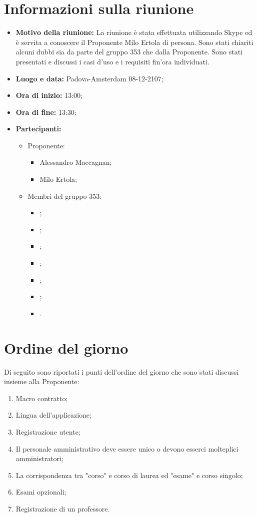 \documentclass[VER-2017-12-08.tex]{subfiles}
\begin{document}
\chapter{Informazioni sulla riunione}
\begin{itemize}
	\item \textbf{Motivo della riunione:} La riunione è stata effettuata utilizzando Skype ed è servita a conoscere il Proponente Milo Ertola di persona. Sono stati chiariti alcuni dubbi sia da parte del gruppo 353 che dalla Proponente. Sono stati presentati e discussi i casi d'uso e i requisiti fin'ora individuati.

	\item \textbf{Luogo e data:} Padova-Amsterdam 08-12-2107;
	\item \textbf{Ora di inizio:} 13:00;
	\item \textbf{Ora di fine:} 13:30;
	\item \textbf{Partecipanti:}
	\begin{itemize}
		\item Proponente:
		\begin{itemize}
			\item Alessandro Maccagnan;
			\item Milo Ertola;
		\end{itemize}
		\item Membri del gruppo 353:
		\begin{itemize}
			\item \Davide;
			\item \Elena;
			\item \Gianluca;
			\item \Mirco;
			\item \Parwinder;
			\item \Riccardo;
			\item \Valentina.
		\end{itemize}
	\end{itemize}
\end{itemize}
\chapter{Ordine del giorno}	
Di seguito sono riportati i punti dell'ordine del giorno che sono stati discussi insieme alla Proponente:
\begin{enumerate}
	\item Macro contratto; 
	\item Lingua dell'applicazione;
	\item Registrazione utente;
	\item Il personale amministrativo deve essere unico o devono esserci molteplici amministratori;
	\item La corrispondenza tra  "corso" e corso di laurea ed "esame" e corso singolo;
	\item Esami opzionali;
	\item Registrazione di un professore.
\end{enumerate}
\end{document}
